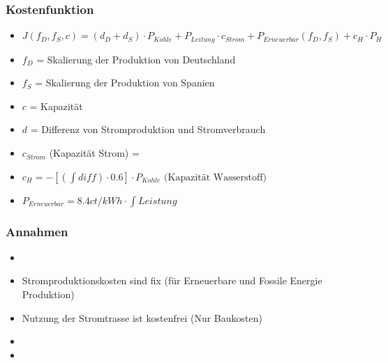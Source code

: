 \documentclass[aspectratio=169,t]{beamer}
\begin{document}
	\begin{frame}
		\frametitle{Kostenfunktion}
		\vspace*{0mm}
			\begin{minipage}{1\linewidth}
			\begin{minipage}{1\linewidth}
				\begin{itemize}
					\item \begin{math}
						J(f_D, f_S, c) = (d_D + d_S) \cdot P_{Kohle} + P_{Leitung} \cdot c_{Strom} + P_{Erneuerbar}(f_D, f_S) + c_H \cdot P_H
					\end{math}
					\item 
					$	f_D$ = Skalierung der Produktion von Deutschland
					
					\item 
						$f_S$ = Skalierung der Produktion von Spanien
					\item 
					$	c$ = Kapazität
					\item 
					$	d$ = Differenz von Stromproduktion und  Stromverbrauch
					\item 
						$c_{Strom}$ (Kapazität Strom) = 
					\item \begin{math}
						c_H = -[ (\int diff) \cdot 0.6] \cdot P_{Kohle} \text{ (Kapazität Wasserstoff)}
					\end{math}
					\item \begin{math} 
						P_{Erneuerbar} = 8.4 {ct}/{kWh} \cdot \int Leistung
					\end{math}
					
				\end{itemize}
			\end{minipage}
			\hfill
			\begin{minipage}{.1\linewidth}
				\centering
				
			\end{minipage}
		\end{minipage}	
	
			
	\end{frame}

		\begin{frame}
		\frametitle{Annahmen}
		\begin{itemize}
			\item
			\item Stromproduktionskosten sind fix (für Erneuerbare und Fossile Energie Produktion)
			\item Nutzung der Stromtrasse ist kostenfrei (Nur Baukosten)
			\item
			\item 
			
		\end{itemize}
	\end{frame}
	
\end{document}
